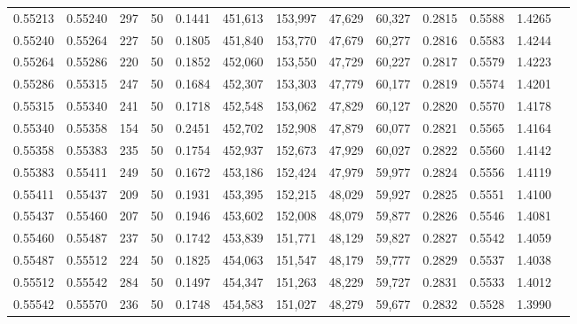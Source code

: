 \begin{tabular}{rrrrrrrrrrrrr}
0.55213 & 0.55240 &   297 &  50 &                                     0.1441 & 451,613 & 153,997 &  47,629 &  60,327 & 0.2815 & 0.5588 & 1.4265 \\
0.55240 & 0.55264 &   227 &  50 &                                     0.1805 & 451,840 & 153,770 &  47,679 &  60,277 & 0.2816 & 0.5583 & 1.4244 \\
0.55264 & 0.55286 &   220 &  50 &                                     0.1852 & 452,060 & 153,550 &  47,729 &  60,227 & 0.2817 & 0.5579 & 1.4223 \\
0.55286 & 0.55315 &   247 &  50 &                                     0.1684 & 452,307 & 153,303 &  47,779 &  60,177 & 0.2819 & 0.5574 & 1.4201 \\
0.55315 & 0.55340 &   241 &  50 &                                     0.1718 & 452,548 & 153,062 &  47,829 &  60,127 & 0.2820 & 0.5570 & 1.4178 \\
0.55340 & 0.55358 &   154 &  50 &                                     0.2451 & 452,702 & 152,908 &  47,879 &  60,077 & 0.2821 & 0.5565 & 1.4164 \\
0.55358 & 0.55383 &   235 &  50 &                                     0.1754 & 452,937 & 152,673 &  47,929 &  60,027 & 0.2822 & 0.5560 & 1.4142 \\
0.55383 & 0.55411 &   249 &  50 &                                     0.1672 & 453,186 & 152,424 &  47,979 &  59,977 & 0.2824 & 0.5556 & 1.4119 \\
0.55411 & 0.55437 &   209 &  50 &                                     0.1931 & 453,395 & 152,215 &  48,029 &  59,927 & 0.2825 & 0.5551 & 1.4100 \\
0.55437 & 0.55460 &   207 &  50 &                                     0.1946 & 453,602 & 152,008 &  48,079 &  59,877 & 0.2826 & 0.5546 & 1.4081 \\
0.55460 & 0.55487 &   237 &  50 &                                     0.1742 & 453,839 & 151,771 &  48,129 &  59,827 & 0.2827 & 0.5542 & 1.4059 \\
0.55487 & 0.55512 &   224 &  50 &                                     0.1825 & 454,063 & 151,547 &  48,179 &  59,777 & 0.2829 & 0.5537 & 1.4038 \\
0.55512 & 0.55542 &   284 &  50 &                                     0.1497 & 454,347 & 151,263 &  48,229 &  59,727 & 0.2831 & 0.5533 & 1.4012 \\
0.55542 & 0.55570 &   236 &  50 &                                     0.1748 & 454,583 & 151,027 &  48,279 &  59,677 & 0.2832 & 0.5528 & 1.3990 \\

\end{tabular}

